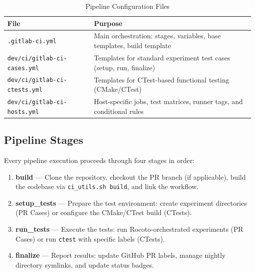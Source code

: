 \documentclass[11pt,letterpaper,twoside]{article}
\begin{document}
\begin{table}[H]
\centering
\caption{Pipeline Configuration Files}
\label{tab:pipeline-files}
\begin{tabularx}{\linewidth}{lX}
\toprule
\textbf{File} & \textbf{Purpose} \\
\midrule
\texttt{.gitlab-ci.yml} & Main orchestration: stages, variables, base templates, build template \\
\texttt{dev/ci/gitlab-ci-cases.yml} & Templates for standard experiment test cases (setup, run, finalize) \\
\texttt{dev/ci/gitlab-ci-ctests.yml} & Templates for CTest-based functional testing (CMake/CTest) \\
\texttt{dev/ci/gitlab-ci-hosts.yml} & Host-specific jobs, test matrices, runner tags, and conditional rules \\
\bottomrule
\end{tabularx}
\end{table}

\subsection{Pipeline Stages}
\label{sec:stages}

Every pipeline execution proceeds through four stages in order:

\begin{enumerate}[leftmargin=1.5em]
  \item \textbf{build} --- Clone the repository, checkout the PR branch (if
    applicable), build the codebase via \texttt{ci\_utils.sh build}, and link
    the workflow.
  \item \textbf{setup\_tests} --- Prepare the test environment: create
    experiment directories (PR Cases) or configure the CMake/CTest build
    (CTests).
  \item \textbf{run\_tests} --- Execute the tests: run Rocoto-orchestrated
    experiments (PR Cases) or run \texttt{ctest} with specific labels (CTests).
  \item \textbf{finalize} --- Report results: update GitHub PR labels, manage
    nightly directory symlinks, and update status badges.
\end{enumerate}
\end{document}
